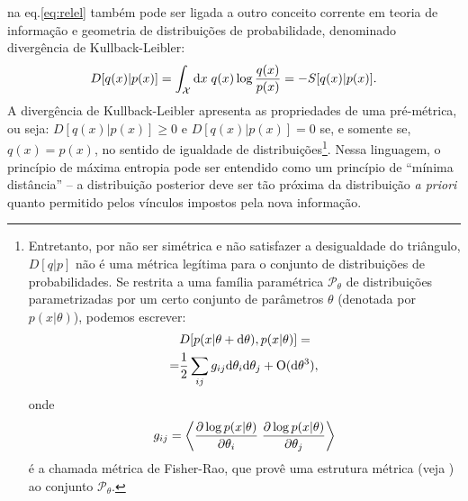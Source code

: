  na eq.\eqref{eq:relel} também pode ser ligada a outro conceito corrente em teoria de informação e geometria de distribuições de probabilidade, denominado divergência de Kullback-Leibler\cite{Amari2000}:
\begin{equation}
\label{eq:kldiv}
 D[q(x) | p(x)] = \int_{\mathcal{X}} \ud x\; q(x) \log\frac{q(x)}{p(x)} = - S[q(x) | p(x)].
\end{equation}
A divergência de Kullback-Leibler apresenta as propriedades de uma pré-métrica, ou seja:  $D[q(x) | p(x)]\ge 0$ e $ D[q(x) | p(x)] = 0$ se, e somente se, $q(x) = p(x)$, no sentido de igualdade de distribuições\footnote{Entretanto, por não ser simétrica e não satisfazer a desigualdade do triângulo, $D[q|p]$ não é uma métrica legítima para o conjunto de distribuições de probabilidades. Se restrita a uma família paramétrica  $\mathcal{P}_\theta$ de distribuições parametrizadas por um certo conjunto de parâmetros $\theta$ (denotada por $p(x|\theta)$), podemos escrever:
\begin{align}
 &D[p(x|\theta+\mathrm{d}\theta), p(x|\theta)] =\nonumber \\= &\frac{1}{2}\sum_{ij} g_{ij} \mathrm{d}\theta_i \mathrm{d}\theta_j + \mathrm{O}(\mathrm{d}\theta^3),\nonumber
\end{align}
onde \[g_{ij} = \left\langle  \frac{\partial \log p(x|\theta)}{\partial \theta_i}\;\frac{\partial \log p(x|\theta)}{\partial \theta_j} \right\rangle\] é a chamada métrica de Fisher-Rao, que provê uma estrutura métrica (veja \citet{Amari2000}) ao conjunto $\mathcal{P}_\theta$.}. Nessa linguagem, o princípio de máxima entropia pode ser entendido como um princípio de ``mínima distância'' -- a distribuição posterior deve ser tão próxima da distribuição \emph{a priori} quanto permitido pelos vínculos impostos pela nova informação. 

